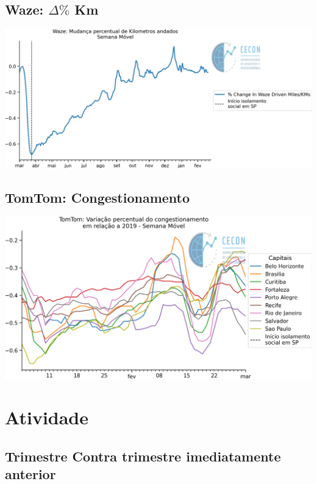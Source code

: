 \documentclass{SelfArx}
\begin{document}
\subsection*{Waze: \(\Delta \%\) Km}
\label{sec:org327e1bb}

\begin{center}
\includegraphics[width=.9\linewidth]{./figs/Granulares/Waze_Brasil.png}
\end{center}

\subsection*{TomTom: Congestionamento}
\label{sec:org0965b63}

\begin{center}
\includegraphics[width=.9\linewidth]{./figs/Granulares/TomTom_Brasil.png}
\end{center}

\section*{Atividade}
\label{sec:org8667c37}


\subsection*{Trimestre Contra trimestre imediatamente anterior}
\label{sec:org2407706}
\end{document}
